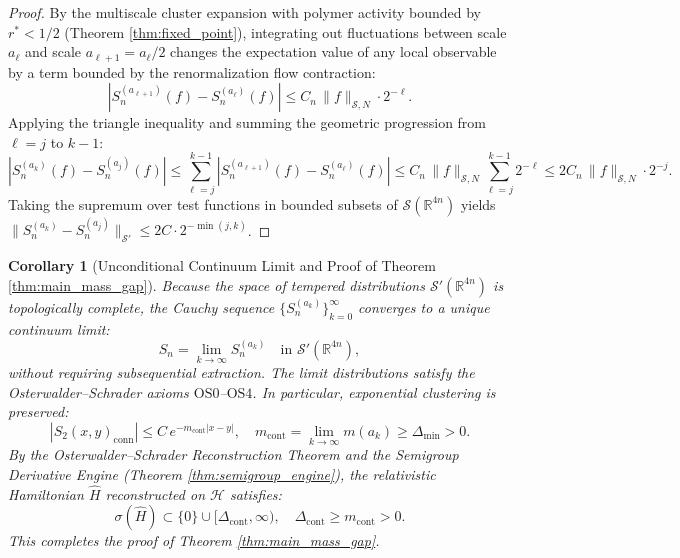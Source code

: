 \documentclass[11pt,reqno]{amsart}
\theoremstyle{plain}
\newtheorem{corollary}[theorem]{Corollary}
\theoremstyle{definition}
\theoremstyle{remark}
\numberwithin{equation}{section}
\begin{document}
\begin{proof}
By the multiscale cluster expansion with polymer activity bounded by $r^* < 1/2$ (Theorem \ref{thm:fixed_point}), integrating out fluctuations between scale $a_\ell$ and scale $a_{\ell+1} = a_\ell/2$ changes the expectation value of any local observable by a term bounded by the renormalization flow contraction:
\begin{equation}
\left| S_n^{(a_{\ell+1})}(f) - S_n^{(a_\ell)}(f) \right| \le C_n \, \|f\|_{\mathcal{S}, N} \cdot 2^{-\ell}.
\end{equation}
Applying the triangle inequality and summing the geometric progression from $\ell = j$ to $k-1$:
\begin{equation}
\left| S_n^{(a_k)}(f) - S_n^{(a_j)}(f) \right| \le \sum_{\ell=j}^{k-1} \left| S_n^{(a_{\ell+1})}(f) - S_n^{(a_\ell)}(f) \right| \le C_n \, \|f\|_{\mathcal{S}, N} \sum_{\ell=j}^{k-1} 2^{-\ell} \le 2 C_n \, \|f\|_{\mathcal{S}, N} \cdot 2^{-j}.
\end{equation}
Taking the supremum over test functions in bounded subsets of $\mathcal{S}(\mathbb{R}^{4n})$ yields $\|S_n^{(a_k)} - S_n^{(a_j)}\|_{\mathcal{S}'} \le 2C \cdot 2^{-\min(j,k)}$.
\end{proof}

\begin{corollary}[Unconditional Continuum Limit and Proof of Theorem \ref{thm:main_mass_gap}]
Because the space of tempered distributions $\mathcal{S}'(\mathbb{R}^{4n})$ is topologically complete, the Cauchy sequence $\{S_n^{(a_k)}\}_{k=0}^\infty$ converges to a unique continuum limit:
\begin{equation}
S_n = \lim_{k \to \infty} S_n^{(a_k)} \quad \text{in } \mathcal{S}'(\mathbb{R}^{4n}),
\end{equation}
without requiring subsequential extraction. The limit distributions satisfy the Osterwalder--Schrader axioms $\mathrm{OS0}$--$\mathrm{OS4}$. In particular, exponential clustering is preserved:
\begin{equation}
|S_2(x, y)_{\mathrm{conn}}| \le C \, e^{-m_{\mathrm{cont}} |x - y|}, \quad m_{\mathrm{cont}} = \lim_{k \to \infty} m(a_k) \ge \Delta_{\min} > 0.
\end{equation}
By the Osterwalder--Schrader Reconstruction Theorem and the Semigroup Derivative Engine (Theorem \ref{thm:semigroup_engine}), the relativistic Hamiltonian $\hat{H}$ reconstructed on $\mathcal{H}$ satisfies:
\begin{equation}
\sigma(\hat{H}) \subset \{0\} \cup [\Delta_{\mathrm{cont}}, \infty), \quad \Delta_{\mathrm{cont}} \ge m_{\mathrm{cont}} > 0.
\end{equation}
This completes the proof of Theorem \ref{thm:main_mass_gap}.
\end{corollary}
\end{document}
